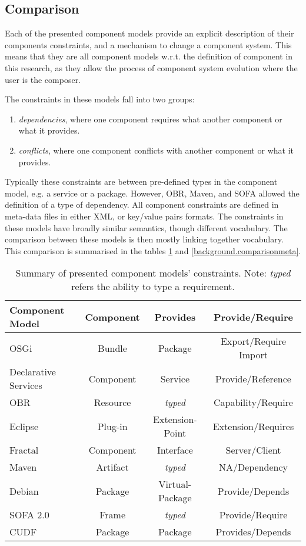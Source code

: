 \subsection{Comparison}
Each of the presented component models provide an explicit description of their components constraints, and a mechanism to change a component system.
This means that they are all component models w.r.t. the definition of component in this research,
as they allow the process of component system evolution where the user is the composer.

The constraints in these models fall into two groups:
\begin{enumerate}
  \item \textit{dependencies}, where one component requires what another component or what it provides.
  \item \textit{conflicts}, where one component conflicts with another component or what it provides. 
\end{enumerate} 
Typically these constraints are between pre-defined types in the component model, e.g. a service or a package.
However, OBR, Maven, and SOFA allowed the definition of a type of dependency. 
All component constraints are defined in meta-data files in either XML, or key/value pairs formats.
The constraints in these models have broadly similar semantics, though different vocabulary.
The comparison between these models is then mostly linking together vocabulary.
This comparison is summarised in the tables  \ref{background.comparisonrel} and \ref{background.comparisonmeta}.  

\begin{table}
\begin{tabular}{|l || c | c | c | }
\hline \textbf{Component Model}& \textbf{Component}& \textbf{Provides}	& \textbf{Provide/Require}\\ \hline

OSGi					& Bundle			& Package 					& Export/Require Import \\
Declarative Services	& Component			& Service 					& Provide/Reference\\
OBR						& Resource			& \textit{typed}			& Capability/Require\\
Eclipse					& Plug-in			& Extension-Point			& Extension/Requires\\
Fractal					& Component			& Interface 				& Server/Client\\
Maven					& Artifact			& \textit{typed} 			& NA/Dependency\\
Debian					& Package			& Virtual-Package 			& Provide/Depends\\
SOFA 2.0				& Frame				& \textit{typed} 			& Provide/Require\\
CUDF					& Package			& Package 					& Provides/Depends\\\hline
\end{tabular}
\caption{Summary of presented component models' constraints. Note: \textit{typed} refers the ability to type a requirement.}
\label{background.comparisonrel}
\end{table}


